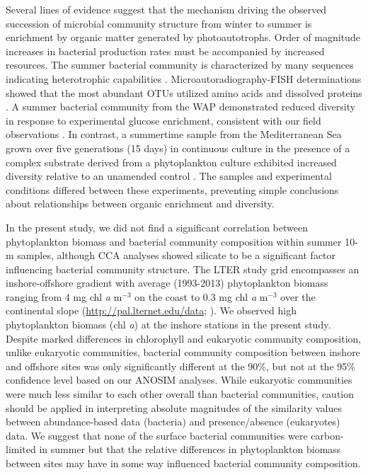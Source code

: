 Several lines of evidence suggest that the mechanism driving the observed succession of microbial community structure from winter to summer is enrichment by organic matter generated by photoautotrophs. Order of magnitude increases in bacterial production rates \citep{dsvse12} must be accompanied by increased resources. The summer bacterial community is characterized by many sequences indicating heterotrophic capabilities \citep{grwddecm12}. Microautoradiography-FISH determinations showed that the most abundant OTUs utilized amino acids and dissolved proteins \citep{straza2010abundance}. A summer bacterial community from the WAP demonstrated reduced diversity in response to experimental glucose enrichment, consistent with our field observations \citep{dmegm11}. In contrast, a summertime sample from the Mediterranean Sea grown over five generations (15 days) in continuous culture in the presence of a complex substrate derived from a phytoplankton culture exhibited increased diversity relative to an unamended control \citep{lckbo13}. The samples and experimental conditions differed between these experiments, preventing simple conclusions about relationships between organic enrichment and diversity.

In the present study, we did not find a significant correlation between phytoplankton biomass and bacterial community composition within summer 10-m samples, although CCA analyses showed silicate to be a significant factor influencing bacterial community structure. The LTER study grid encompasses an inshore-offshore gradient with average (1993-2013) phytoplankton biomass ranging from 4 mg chl \textit{a} m$^{-3}$ on the coast to 0.3 mg chl \textit{a} m$^{-3}$ over the continental slope (\url{http://pal.lternet.edu/data};  \citealt{gvf05,sdv96,sbbs98,sbv98}). We observed high phytoplankton biomass (chl \textit{a}) at the inshore stations in the present study. Despite marked differences in chlorophyll and eukaryotic community composition, unlike eukaryotic communities, bacterial community composition between inshore and offshore sites was only significantly different at the 90\%, but not at the 95\% confidence level based on our ANOSIM analyses. While eukaryotic communities were much less similar to each other overall than bacterial communities, caution should be applied in interpreting absolute magnitudes of the similarity values between abundance-based data (bacteria) and presence/absence (eukaryotes) data. We suggest that none of the surface bacterial communities were carbon-limited in summer but that the relative differences in phytoplankton biomass between sites may have in some way influenced bacterial community composition.

